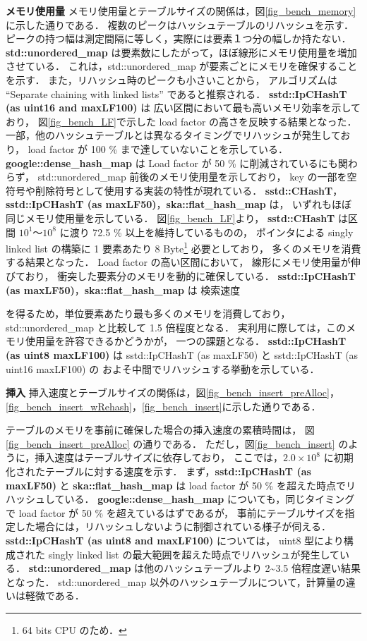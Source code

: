 %
{\bf メモリ使用量}
\samepage\newline\indent
メモリ使用量とテーブルサイズの関係は，図\ref{fig_bench_memory}に示した通りである．
複数のピークはハッシュテーブルのリハッシュを示す．
ピークの持つ幅は測定間隔に等しく，実際には要素１つ分の幅しか持たない．
{\bf std::unordered\_map} は要素数にしたがって，ほぼ線形にメモリ使用量を増加させている．
これは，std::unordered\_map が要素ごとにメモリを確保することを示す．
また，リハッシュ時のピークも小さいことから，
アルゴリズムは ``Separate chaining with linked lists'' であると推察される．
{\bf sstd::IpCHashT (as uint16 and maxLF100)} は
広い区間において最も高いメモリ効率を示しており，
図\ref{fig_bench_LF}で示した load factor の高さを反映する結果となった．
一部，他のハッシュテーブルとは異なるタイミングでリハッシュが発生しており，
load factor が 100 \% まで達していないことを示している．
{\bf google::dense\_hash\_map} は
Load factor が 50 \% に削減されているにも関わらず，
std::unordered\_map 前後のメモリ使用量を示しており，
key の一部を空符号や削除符号として使用する実装の特性が現れている．
{\bf sstd::CHashT}，{\bf sstd::IpCHashT (as maxLF50)}，{\bf ska::flat\_hash\_map} は，
いずれもほぼ同じメモリ使用量を示している．
図\ref{fig_bench_LF}より，
{\bf sstd::CHashT} は区間 $10^1〜10^8$ に渡り 72.5 \% 以上を維持しているものの，
ポインタによる singly linked list の構築に 1 要素あたり 8 Byte\footnote{64 bits CPU のため．} 必要としており，
多くのメモリを消費する結果となった．
Load factor の高い区間において，
線形にメモリ使用量が伸びており，
衝突した要素分のメモリを動的に確保している．
{\bf sstd::IpCHashT (as maxLF50)}，{\bf ska::flat\_hash\_map} は
検索速度

\noindent
を得るため，単位要素あたり最も多くのメモリを消費しており，
std::unordered\_map と比較して 1.5 倍程度となる．
実利用に際しては，このメモリ使用量を許容できるかどうかが，
一つの課題となる．
{\bf sstd::IpCHashT (as uint8 maxLF100)} は
sstd::IpCHashT (as maxLF50) と sstd::IpCHashT (as uint16 maxLF100) の
およそ中間でリハッシュする挙動を示している．
\leavevmode \newline

%
{\bf 挿入}
\samepage\newline\indent
挿入速度とテーブルサイズの関係は，図\ref{fig_bench_insert_preAlloc}，\ref{fig_bench_insert_wRehash}，\ref{fig_bench_insert}に示した通りである．

テーブルのメモリを事前に確保した場合の挿入速度の累積時間は，
図\ref{fig_bench_insert_preAlloc} の通りである．
ただし，図\ref{fig_bench_insert} のように，挿入速度はテーブルサイズに依存しており，
ここでは，$2.0\times10^8$ に初期化されたテーブルに対する速度を示す．
まず，{\bf sstd::IpCHashT (as maxLF50)} と {\bf ska::flat\_hash\_map} は load factor が 50 \% を超えた時点でリハッシュしている．
{\bf google::dense\_hash\_map} についても，同じタイミングで load factor が 50 \% を超えているはずであるが，
事前にテーブルサイズを指定した場合には，リハッシュしないように制御されている様子が伺える．
{\bf sstd::IpCHashT (as uint8 and maxLF100)} については，
uint8 型により構成された singly linked list の最大範囲を超えた時点でリハッシュが発生している．
{\bf std::unordered\_map} は他のハッシュテーブルより 2\textasciitilde 3.5 倍程度遅い結果となった．
std::unordered\_map 以外のハッシュテーブルについて，計算量の違いは軽微である．

